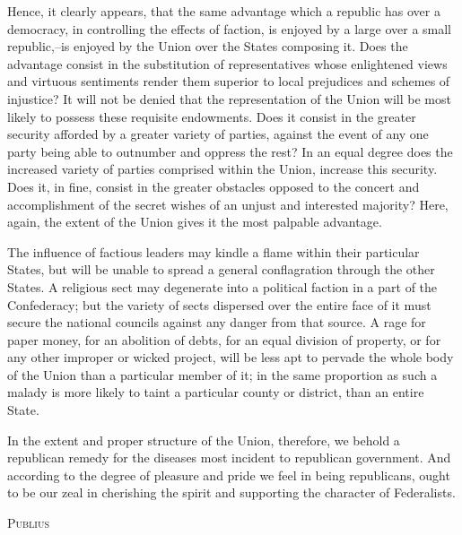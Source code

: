 Hence, it clearly appears, that the same advantage which a republic has over a democracy, in controlling the effects of faction, is enjoyed by a large over a small republic,--is enjoyed by the Union over the States composing it. Does the advantage consist in the substitution of representatives whose enlightened views and virtuous sentiments render them superior to local prejudices and schemes of injustice? It will not be denied that the representation of the Union will be most likely to possess these requisite endowments. Does it consist in the greater security afforded by a greater variety of parties, against the event of any one party being able to outnumber and oppress the rest? In an equal degree does the increased variety of parties comprised within the Union, increase this security. Does it, in fine, consist in the greater obstacles opposed to the concert and accomplishment of the secret wishes of an unjust and interested majority? Here, again, the extent of the Union gives it the most palpable advantage.

The influence of factious leaders may kindle a flame within their particular States, but will be unable to spread a general conflagration through the other States. A religious sect may degenerate into a political faction in a part of the Confederacy; but the variety of sects dispersed over the entire face of it must secure the national councils against any danger from that source. A rage for paper money, for an abolition of debts, for an equal division of property, or for any other improper or wicked project, will be less apt to pervade the whole body of the Union than a particular member of it; in the same proportion as such a malady is more likely to taint a particular county or district, than an entire State.

In the extent and proper structure of the Union, therefore, we behold a republican remedy for the diseases most incident to republican government. And according to the degree of pleasure and pride we feel in being republicans, ought to be our zeal in cherishing the spirit and supporting the character of Federalists.

\vspace{.5cm}
\textsc{Publius}

\vspace{1.5cm}

